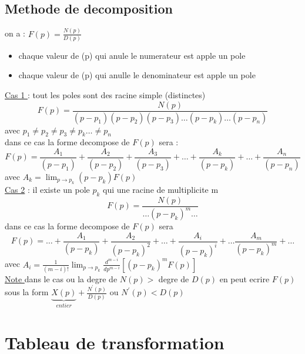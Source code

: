 \documentclass[12pt]{book}
\begin{document}
            \subsection{Methode de decomposition }
            on a : $F(p) = \frac{N(p)}{D(p)}$ 
                \begin{itemize}
                    \item chaque valeur de (p) qui anule le numerateur est apple un pole
                    \item chaque valeur de (p) qui anulle le denominateur est apple un pole 
                \end{itemize}
            \underline{Cas 1 } : tout les poles sont des racine simple (distinctes) \\
            $$ F(p) = \frac{N(p)}{(p-p_1)(p-p_2)(p-p_3)\ldots(p-p_k) \ldots(p-p_n)} $$ avec $p_1 \not = p_2 \not = p_3 \not = p_k  \ldots \not = p_n$ \\
            dans ce cas la forme decompose de $F(p)$ sera :\\
            $$  F(p) = \frac{A_1}{(p-p_1)}+\frac{A_2}{(p-p_2)}+\frac{A_3}{(p-p_3)}+\ldots+\frac{A_k}{(p-p_k)}+\ldots+\frac{A_n}{(p-p_n)} $$
            avec $A_k = \lim_{p\to p_k}(p-p_k)F(p)$ \\
            \underline{Cas 2} : il existe un pole $p_k$ qui une racine de multiplicite m \\
            $$ F(p) = \frac{N(p)}{\ldots (p-p_k)^m \ldots} $$
            dans ce cas la forme decompose de $F(p)$ sera 
            $$ F(p) = \ldots + \frac{A_1}{(p-p_k)} + \frac{A_2}{(p-p_k)^2} + \ldots +\frac{A_i}{(p-p_k)^i} + \ldots \frac{A_m}{(p-p_k)^m} +\ldots $$
            avec $A_i = \frac{1}{(m-i)!}\lim_{p\to p_k}\frac{d^{m-i}}{dp^{m-i}} \left[ (p-p_k)^mF(p) \right] $
            \\ \underline{Note } dans le cas ou la degre de $N(p) >$ degre de $D(p)$ en peut ecrire $F(p)$ sous la form $\underbrace{X(p)}_{entier} + \frac{N^{'}(p)}{D(p)}$ ou $N^{'}(p) < D(p)$
        \pagebreak
        \section{Tableau de transformation} 
        
\end{document}

